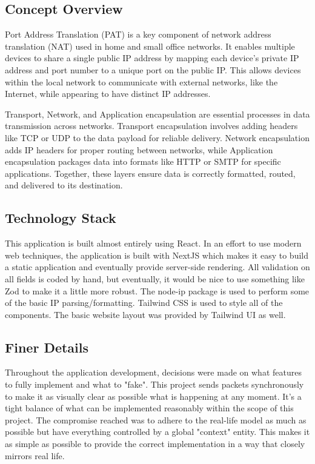 \documentclass{assignment-x}
\begin{document}
\subsection{Concept Overview}
Port Address Translation (PAT) is a key component of network address translation (NAT) used in home and small office networks\cite{geeksforgeeks_nat_pat}. It enables multiple devices to share a single public IP address by mapping each device's private IP address and port number to a unique port on the public IP. This allows devices within the local network to communicate with external networks, like the Internet, while appearing to have distinct IP addresses.

Transport, Network, and Application encapsulation are essential processes in data transmission across networks. Transport encapsulation involves adding headers like TCP or UDP to the data payload for reliable delivery\cite{karthikayan2024}. Network encapsulation adds IP headers for proper routing between networks, while Application encapsulation packages data into formats like HTTP or SMTP for specific applications. Together, these layers ensure data is correctly formatted, routed, and delivered to its destination.

\subsection{Technology Stack}
This application is built almost entirely using React\cite{react}. In an effort to use modern web techniques, the application is built with NextJS which makes it easy to build a static application and eventually provide server-side rendering. All validation on all fields is coded by hand, but eventually, it would be nice to use something like Zod to make it a little more robust. The node-ip package is used to perform some of the basic IP parsing/formatting. Tailwind CSS \cite{tailwindcss} is used to style all of the components. The basic website layout was provided by Tailwind UI \cite{tailwindui} as well.

\subsection{Finer Details}
Throughout the application development, decisions were made on what features to fully implement and what to "fake". This project sends packets synchronously to make it as visually clear as possible what is happening at any moment. It's a tight balance of what can be implemented reasonably within the scope of this project. The compromise reached was to adhere to the real-life model as much as possible but have everything controlled by a global "context" entity. This makes it as simple as possible to provide the correct implementation in a way that closely mirrors real life.
\end{document}
